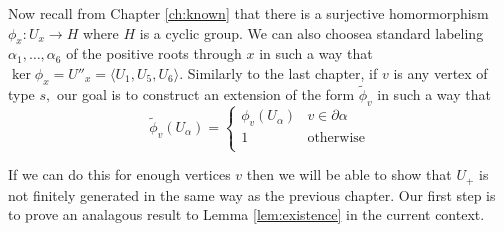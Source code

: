 \documentclass[class=book, crop=false]{standalone}
\begin{document}
Now recall from Chapter \ref{ch:known} that there is a surjective homormorphism $\phi_x:U_x\to H$ where $H$ is a cyclic group. We can also choosea standard labeling $\alpha_1,\dots,\alpha_6$ of the positive roots through $x$ in such a way that $\ker \phi_x=U''_x=\langle U_1,U_5,U_6\rangle.$ Similarly to the last chapter, if $v$ is any vertex of type $s,$ our goal is to construct an extension of the form $\tilde{\phi}_v$ in such a way that
\[
	\tilde{\phi}_v(U_\alpha)=\begin{cases}\phi_v(U_\alpha)&v\in \partial\alpha\\
		1&\text{otherwise}\\
\end{cases}
	\]

	If we can do this for enough vertices $v$ then we will be able to show that $U_+$ is not finitely generated in the same way as the previous chapter. Our first step is to prove an analagous result to Lemma \ref{lem:existence} in the current context.
\end{document}
